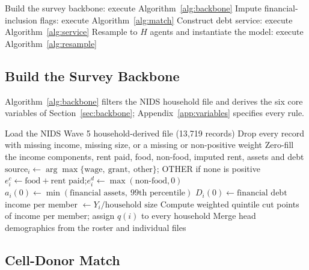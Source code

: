 \begin{algorithm}[!htbp]
\caption{Initialisation}
\label{alg:init}
\begin{algorithmic}
\State Build the survey backbone: execute Algorithm~\ref{alg:backbone}
\State Impute financial-inclusion flags: execute Algorithm~\ref{alg:match}
\State Construct debt service: execute Algorithm~\ref{alg:service}
\State Resample to $H$ agents and instantiate the model: execute Algorithm~\ref{alg:resample}
\end{algorithmic}
\end{algorithm}

\subsection{Build the Survey Backbone}\label{app:init-backbone}

Algorithm~\ref{alg:backbone} filters the \ac{NIDS} household file and derives the six core
variables of Section~\ref{sec:backbone}; Appendix~\ref{app:variables} specifies every rule.

\begin{algorithm}[!htbp]
\caption{Build the survey backbone}
\label{alg:backbone}
\begin{algorithmic}
\State Load the \ac{NIDS} Wave 5 household-derived file (13{,}719 records)
\State Drop every record with missing income, missing size, or a missing or non-positive weight 
    \State Zero-fill the income components, rent paid, food, non-food, imputed rent, assets and debt 
    \State $\text{source}_i \gets \arg\max\{\text{wage},\ \text{grant},\ \text{other}\}$; OTHER if none is positive
    \State $e^c_i \gets \text{food} + \text{rent paid}$;\quad $e^d_i \gets \max(\text{non-food}, 0)$
    \State $a_i(0) \gets \min(\text{financial assets},\ \text{99th percentile})$
    \State $D_i(0) \gets \text{financial debt}$
    \State income per member $\gets Y_i / \text{household size}$
\EndFor
\State Compute weighted quintile cut points of income per member; assign $q(i)$ to every household
\State Merge head demographics from the roster and individual files 
\end{algorithmic}
\end{algorithm}

\subsection{Cell-Donor Match}\label{app:init-match}

